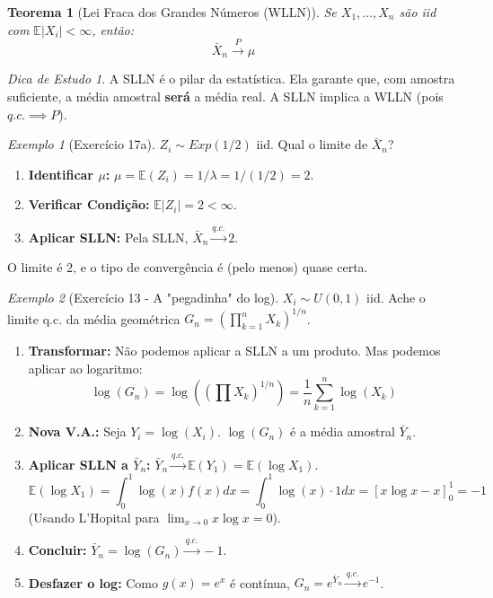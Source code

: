 \documentclass[a4paper, 10pt]{article} %
\theoremstyle{definition}
\theoremstyle{plain}
\newtheorem{theorem}{Teorema}[section]
\theoremstyle{remark}
\newtheorem{example}{Exemplo}[section]
\newtheorem*{tip}{Dica de Estudo} %
\newcommand{\E}{\mathbb{E}}
\newcommand{\pto}{\xrightarrow{P}}      %
\newcommand{\qcto}{\xrightarrow{q.c.}}  %
\newcommand{\Xn}{\bar{X}_n}             %
\begin{document}
\begin{theorem}[Lei Fraca dos Grandes Números (WLLN)]
Se $X_1, ..., X_n$ são iid com $\E|X_i| < \infty$, então:
$$ \Xn \pto \mu $$
\end{theorem}

\begin{tip}
    A SLLN é o pilar da estatística. Ela garante que, com amostra suficiente, a média amostral \textbf{será} a média real. A SLLN implica a WLLN (pois $q.c. \implies P$).
\end{tip}

\begin{example}[Exercício 17a]
    $Z_i \sim Exp(1/2)$ iid. Qual o limite de $\Xn$?
    \begin{enumerate}
        \item \textbf{Identificar $\mu$:} $\mu = \E(Z_i) = 1/\lambda = 1/(1/2) = 2$.
        \item \textbf{Verificar Condição:} $\E|Z_i| = 2 < \infty$.
        \item \textbf{Aplicar SLLN:} Pela SLLN, $\Xn \qcto 2$.
    \end{enumerate}
    O limite é 2, e o tipo de convergência é (pelo menos) quase certa.
\end{example}

\begin{example}[Exercício 13 - A "pegadinha" do log]
    $X_i \sim U(0,1)$ iid. Ache o limite q.c. da média geométrica $G_n = (\prod_{k=1}^{n} X_k)^{1/n}$.
    \begin{enumerate}
        \item \textbf{Transformar:} Não podemos aplicar a SLLN a um produto. Mas podemos aplicar ao logaritmo:
        $$ \log(G_n) = \log\left( (\prod X_k)^{1/n} \right) = \frac{1}{n} \sum_{k=1}^n \log(X_k) $$
        \item \textbf{Nova V.A.:} Seja $Y_i = \log(X_i)$. $\log(G_n)$ é a média amostral $\bar{Y}_n$.
        \item \textbf{Aplicar SLLN a $\bar{Y}_n$:} $\bar{Y}_n \qcto \E(Y_1) = \E(\log X_1)$.
        $$ \E(\log X_1) = \int_0^1 \log(x) f(x) dx = \int_0^1 \log(x) \cdot 1 dx = [x \log x - x]_0^1 = -1 $$
        (Usando L'Hopital para $\lim_{x \to 0} x \log x = 0$).
        \item \textbf{Concluir:} $\bar{Y}_n = \log(G_n) \qcto -1$.
        \item \textbf{Desfazer o log:} Como $g(x) = e^x$ é contínua, $G_n = e^{\bar{Y}_n} \qcto e^{-1}$.
    \end{enumerate}
\end{example}
\end{document}
